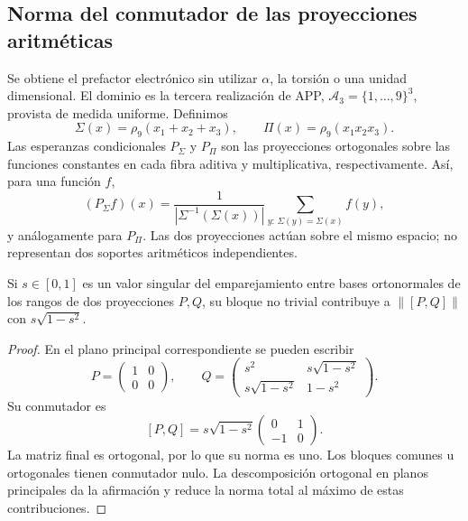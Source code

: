 

\subsection{Norma del conmutador de las proyecciones aritméticas}

Se obtiene el prefactor electrónico sin utilizar \(\alpha\), la torsión
o una unidad dimensional. El dominio es la tercera realización de APP,
\(\mathcal A_3=\{1,\ldots,9\}^3\), provista de medida uniforme.
Definimos
\[
 \Sigma(x)=\rho_9(x_1+x_2+x_3),\qquad
 \Pi(x)=\rho_9(x_1x_2x_3).
\]
Las esperanzas condicionales \(P_\Sigma\) y \(P_\Pi\) son las
proyecciones ortogonales sobre las funciones constantes en cada fibra
aditiva y multiplicativa, respectivamente. Así, para una función \(f\),
\[
 (P_\Sigma f)(x)
 =\frac{1}{|\Sigma^{-1}(\Sigma(x))|}
   \sum_{y:\,\Sigma(y)=\Sigma(x)}f(y),
\]
y análogamente para \(P_\Pi\). Las dos proyecciones actúan sobre el
mismo espacio; no representan dos soportes aritméticos independientes.

\begin{lemma}
Si \(s\in[0,1]\) es un valor singular del emparejamiento entre bases
ortonormales de los rangos de dos proyecciones \(P,Q\), su bloque no
trivial contribuye a \(\|[P,Q]\|\) con
\(s\sqrt{1-s^2}\).
\end{lemma}
\begin{proof}
En el plano principal correspondiente se pueden escribir
\[
 P=\begin{pmatrix}1&0\\0&0\end{pmatrix},\qquad
 Q=\begin{pmatrix}
 s^2&s\sqrt{1-s^2}\\
 s\sqrt{1-s^2}&1-s^2
 \end{pmatrix}.
\]
Su conmutador es
\[
 [P,Q]=s\sqrt{1-s^2}
 \begin{pmatrix}0&1\\-1&0\end{pmatrix}.
\]
La matriz final es ortogonal, por lo que su norma es uno. Los bloques
comunes u ortogonales tienen conmutador nulo. La descomposición ortogonal
en planos principales da la afirmación y reduce la norma total al máximo
de estas contribuciones.
\end{proof}

